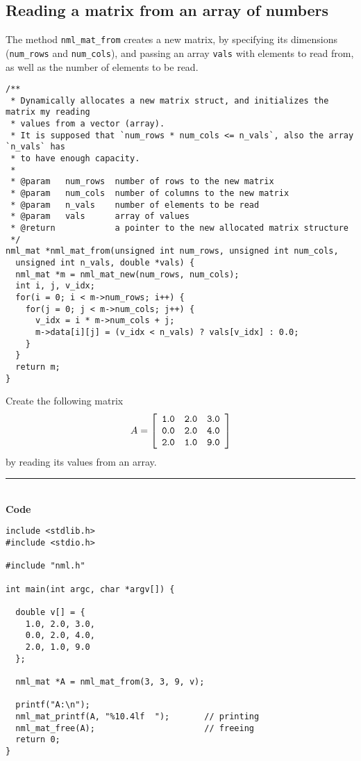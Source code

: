 \subsection{Reading a matrix from an array of numbers}

The method {\tt nml\_mat\_from} creates a new matrix, by specifying its dimensions ({\tt num\_rows} and {\tt num\_cols}), and passing an array {\tt vals} with elements to read from, as well as the number of elements to be read.

\begin{verbatim}
/**
 * Dynamically allocates a new matrix struct, and initializes the matrix my reading
 * values from a vector (array).
 * It is supposed that `num_rows * num_cols <= n_vals`, also the array `n_vals` has
 * to have enough capacity.
 *
 * @param   num_rows  number of rows to the new matrix
 * @param   num_cols  number of columns to the new matrix
 * @param   n_vals    number of elements to be read
 * @param   vals      array of values
 * @return            a pointer to the new allocated matrix structure 
 */
nml_mat *nml_mat_from(unsigned int num_rows, unsigned int num_cols, 
  unsigned int n_vals, double *vals) {
  nml_mat *m = nml_mat_new(num_rows, num_cols);
  int i, j, v_idx;
  for(i = 0; i < m->num_rows; i++) {
    for(j = 0; j < m->num_cols; j++) {
      v_idx = i * m->num_cols + j;
      m->data[i][j] = (v_idx < n_vals) ? vals[v_idx] : 0.0;
    }
  }
  return m;
}
\end{verbatim}

\example \textsf{Create the following matrix}
$$
A = \left[
\begin{array}{rrr}
\tt 1.0 & \tt 2.0 & \tt 3.0 \\
\tt 0.0 & \tt 2.0 & \tt 4.0 \\
\tt 2.0 & \tt 1.0 & \tt 9.0
\end{array}
\right]
$$
\textsf{by reading its values from an array}.

\rule{80mm}{0.5pt}\\
{\bf Code}
\begin{verbatim}
include <stdlib.h>
#include <stdio.h>

#include "nml.h"

int main(int argc, char *argv[]) {

  double v[] = {
    1.0, 2.0, 3.0,
    0.0, 2.0, 4.0,
    2.0, 1.0, 9.0
  };

  nml_mat *A = nml_mat_from(3, 3, 9, v);

  printf("A:\n");
  nml_mat_printf(A, "%10.4lf  ");       // printing
  nml_mat_free(A);                      // freeing
  return 0;
}
\end{verbatim}

